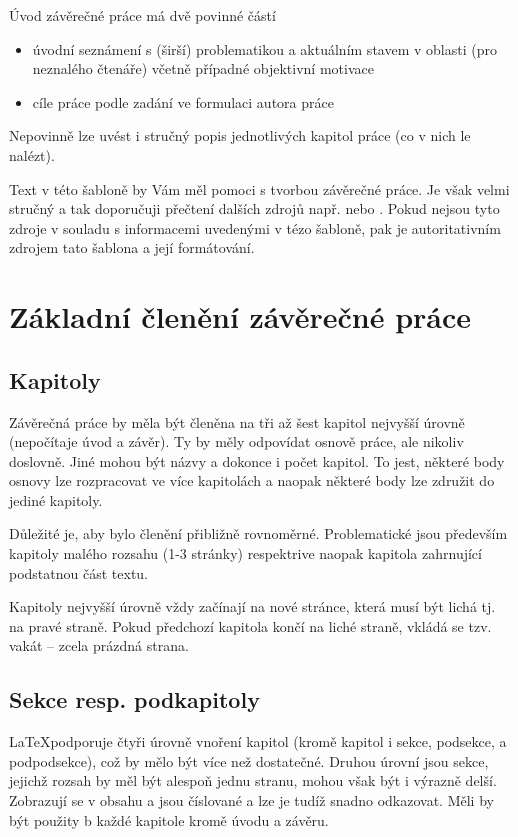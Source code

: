 \documentclass[male,czech,api_bc]{kitheses}
\begin{document}

Úvod závěrečné práce má dvě povinné částí

\begin{itemize}
\item úvodní seznámení s (širší) problematikou a aktuálním stavem v oblasti (pro neznalého čtenáře) včetně případné objektivní motivace 
\item cíle práce podle zadání ve formulaci autora práce
\end{itemize}

Nepovinně lze uvést i stručný popis jednotlivých kapitol práce (co v nich le nalézt).

Text v této šabloně by Vám měl pomoci s tvorbou závěrečné práce. Je však velmi stručný a tak doporučuji přečtení dalších zdrojů např. \cite{Katuscakc2008} nebo 
\cite{Ticha2009}. Pokud nejsou tyto zdroje v souladu s informacemi uvedenými v tézo šabloně, pak je autoritativním zdrojem tato šablona a její formátování.

\chapter{Základní členění závěrečné práce}

\section{Kapitoly}

Závěrečná práce by měla být členěna na tři až šest kapitol nejvyšší úrovně (nepočítaje úvod a závěr). Ty by měly odpovídat osnově práce, ale nikoliv doslovně. Jiné mohou být názvy a dokonce i počet kapitol. To jest, některé body osnovy lze rozpracovat ve více kapitolách a naopak některé body lze združit do jediné kapitoly.

Důležité je, aby bylo členění přibližně rovnoměrné. Problematické jsou především kapitoly malého rozsahu (1-3 stránky) respektrive naopak kapitola zahrnující podstatnou část textu.

Kapitoly nejvyšší úrovně vždy začínají na nové stránce, která musí být lichá tj. na pravé straně. Pokud předchozí kapitola končí na liché straně, vkládá se tzv. vakát -- zcela prázdná strana. 

\section{Sekce resp. podkapitoly}

\LaTeX podporuje čtyři úrovně vnoření kapitol (kromě kapitol i sekce, podsekce, a podpodsekce), což by mělo být více než dostatečné. Druhou úrovní jsou sekce, jejichž rozsah by měl být alespoň jednu stranu, mohou však být
i výrazně delší. Zobrazují se v obsahu a jsou číslované a lze je tudíž snadno odkazovat. Měli by být použity b každé kapitole kromě úvodu a závěru.
\end{document}
